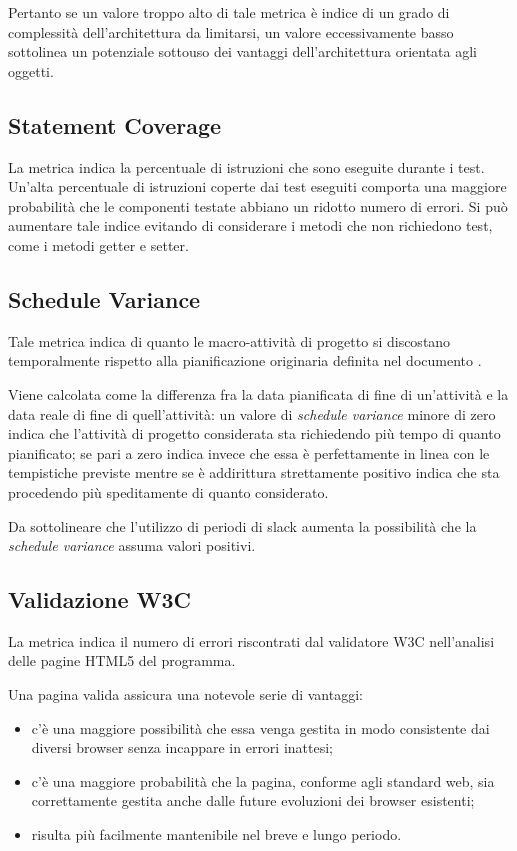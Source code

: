 Pertanto se un valore troppo alto di tale metrica è indice di un grado di complessità dell'architettura da limitarsi, un valore eccessivamente basso sottolinea un potenziale sottouso dei vantaggi dell'architettura orientata agli oggetti.


\subsection{Statement Coverage}
La metrica indica la percentuale di istruzioni che sono eseguite durante i test. Un'alta percentuale di istruzioni coperte dai test eseguiti comporta una maggiore probabilità che le componenti testate abbiano un ridotto numero di errori. Si può aumentare tale indice evitando di considerare i metodi che non richiedono test, come i metodi getter e setter.


\subsection{Schedule Variance}
Tale metrica indica di quanto le macro-attività di progetto si discostano temporalmente rispetto alla pianificazione originaria definita nel documento \PdP . 

Viene calcolata come la differenza fra la data pianificata di fine di un'attività e la data reale di fine di quell'attività: un valore di \emph{schedule variance} minore di zero indica che l'attività di progetto considerata sta richiedendo più tempo di quanto pianificato; se pari a zero indica invece che essa è perfettamente in linea con le tempistiche previste mentre se è addirittura strettamente positivo indica che sta procedendo più speditamente di quanto considerato. 

Da sottolineare che l'utilizzo di periodi di slack aumenta la possibilità che la \emph{schedule variance} assuma valori positivi.


\subsection{Validazione W3C}
La metrica indica il numero di errori riscontrati dal validatore W3C nell'analisi delle pagine HTML5 del programma.

Una pagina valida assicura una notevole serie di vantaggi:
\begin{itemize}
 	\item c'è una maggiore possibilità che essa venga gestita in modo consistente dai diversi browser senza incappare in errori inattesi;
 	\item c'è una maggiore probabilità che la pagina, conforme agli standard web, sia correttamente gestita anche dalle future evoluzioni dei browser esistenti;
 	\item risulta più facilmente mantenibile nel breve e lungo periodo.
\end{itemize}


